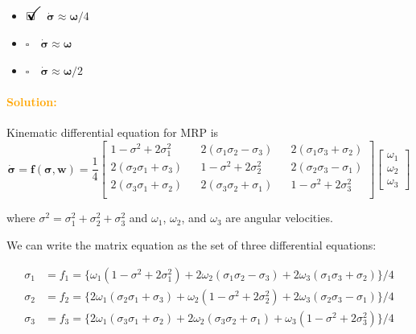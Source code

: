 \documentclass[12pt, a4paper]{article}
\newcommand{\ans}{\item[]$\rlap{\LARGE{\checkmark}}\square\quad$}
\newcommand{\noans}{\item[]$\square\quad$}
\begin{document}
\begin{itemize}
\ans $\dot{\bm{\sigma}} \approx \bm{\omega}/4$
\noans $\dot{\bm{\sigma}} \approx \bm{\omega}$
\noans $\dot{\bm{\sigma}} \approx \bm{\omega}/2$
\end{itemize}

\paragraph{\textcolor{orange}{Solution:}}
Kinematic differential equation for MRP is
$$
\dot{\bm{\sigma}} = \bm{f}(\bm{\sigma},\bm{w}) = \frac{1}{4}
\begin{bmatrix}
    1-\sigma^{2}+2\sigma_{1}^{2} && 2(\sigma_{1}\sigma_{2}-\sigma_{3}) && 2(\sigma_{1}\sigma_{3}+\sigma_{2}) \\
    2(\sigma_{2}\sigma_{1}+\sigma_{3}) && 1-\sigma^{2}+2\sigma_{2}^{2} && 2(\sigma_{2}\sigma_{3}-\sigma_{1}) \\
    2(\sigma_{3}\sigma_{1}+\sigma_{2}) && 2(\sigma_{3}\sigma_{2}+\sigma_{1}) && 1-\sigma^{2}+2\sigma_{3}^{2} \\
\end{bmatrix}
\begin{bmatrix}
  \omega_{1}\\\omega_{2}\\\omega_{3}
\end{bmatrix}
$$

where $\sigma^{2}=\sigma_{1}^{2}+\sigma_{2}^{2}+\sigma_{3}^{2}$ and $\omega_{1}$, $\omega_{2}$, and $\omega_{3}$ are angular velocities.

We can write the matrix equation as the set of three differential equations:

\begin{equation*}
    \begin{split}
        \sigma_{1}&=f_{1}=\{\omega_{1}(1-\sigma^{2}+2\sigma_{1}^{2})+2\omega_{2}(\sigma_{1}\sigma_{2}-\sigma_{3})+2\omega_{3}(\sigma_{1}\sigma_{3}+\sigma_{2})\}/4 \\
        \sigma_{2}&=f_{2}=\{2\omega_{1}(\sigma_{2}\sigma_{1}+\sigma_{3})+\omega_{2}(1-\sigma^{2}+2\sigma_{2}^{2})+2\omega_{3}(\sigma_{2}\sigma_{3}-\sigma_{1})\}/4 \\
        \sigma_{3}&=f_{3}=\{2\omega_{1}(\sigma_{3}\sigma_{1}+\sigma_{2})+2\omega_{2}(\sigma_{3}\sigma_{2}+\sigma_{1})+\omega_{3}(1-\sigma^{2}+2\sigma_{3}^{2})\}/4 \\
    \end{split}
\end{equation*}
\end{document}

